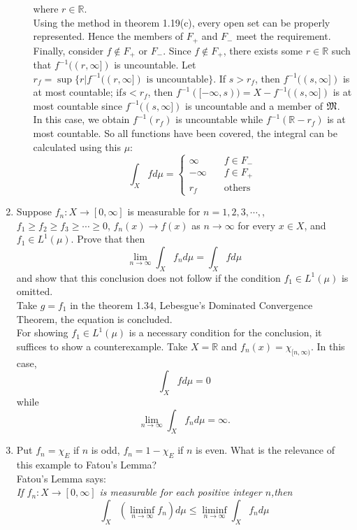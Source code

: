\documentclass{article}
\begin{document}
\begin{enumerate}
\begin{enumerate}
 		where $r\in\mathbb{R}$.\\
 		Using the method in theorem 1.19(c), every open set can be properly represented. Hence the members of $F_{+}$ and $F_{-}$ meet the requirement.\\
 		Finally, consider $f\notin F_{+}$ or $F_{-}$. Since $f\notin F_{+}$, there exists some $r\in\mathbb{R}$ such that $f^{-1}((r,\infty])$ is uncountable. Let $r_f=\sup\{r| f^{-1}((r,\infty])\text{ is uncountable}\}$. If $s>r_f$, then $f^{-1}((s,\infty])$ is at most countable; if$s<r_f$, then $f^{-1}([-\infty,s))=X-f^{-1}((s,\infty])$ is at most countable since $f^{-1}((s,\infty])$ is uncountable and a member of $\mathfrak{M}$. In this case, we obtain $f^{-1}({r_f})$ is uncountable while $f^{-1}(\mathbb{R}-{r_f})$ is at most countable. So all functions have been covered, the integral can be calculated using this $\mu$:
 		\[
 			\int_{X}fd\mu=\begin{cases}
 			\infty\quad&f\in{F_{-}}\\
 			-\infty\quad&f\in{F_{+}}\\
 			r_f\quad&\text{others}
 			\end{cases}
 		\]
  	\end{enumerate}
 	\item \exercise Suppose $f_n:X\to[0,\infty]$ is measurable for $n=1,2,3,\cdots,$, $f_1\geq f_2\geq f_3\geq\cdots\geq0$, $f_n(x)\to f(x)$ as $n\to\infty$ for every $x\in X$, and $f_1\in L^1(\mu)$. Prove that then
 	\[
 		\lim\limits_{n\to\infty}\int_{X}f_nd\mu=\int_Xfd\mu
 	\]
 	and show that this conclusion does not follow if the condition $f_1\in L^1(\mu)$ is omitted.\\
 	\solution Take $g=f_1$ in the theorem 1.34, Lebesgue's Dominated Convergence Theorem, the equation is concluded.\\
 	For showing $f_1\in L^1(\mu)$ is a necessary condition for the conclusion, it suffices to show a counterexample. Take $X=\mathbb{R}$ and $f_n(x)=\chi_{[n,\infty)}$. In this case,
 	\[
 		\int_X fd\mu=0
 	\]
 	while
 	\[
 		\lim\limits_{n\to\infty}\int_X f_nd\mu=\infty.
 	\]
 	\item \exercise Put $f_n = \chi_E$ if $n$ is odd, $f_n=1-\chi_E$ if $n$ is even. What is the relevance of this example to Fatou's Lemma?\\
 	\solution Fatou's Lemma says:\\
 	
 	\textit{If $f_n:X\to[0,\infty]$ is measurable for each positive integer $n$,then \[\int_X\left(\liminf_{n\to\infty}f_n\right)d\mu\leq\liminf_{n\to\infty}\int_X f_nd\mu\]}
 	

\end{enumerate}
\end{document}

